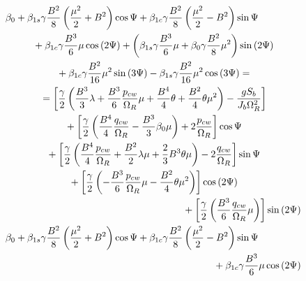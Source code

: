 \begin{gather}
  \label{eq-aero-flapping-coefs-ccw-3}
  \begin{multlined}[0.88\textwidth]
    \beta_0
    + 
    \beta_{1s} \gamma \frac{B^2}{8}
    \left( \frac{\mu^2}{2} + B^2 \right) \cos \Psi
    +
    \beta_{1c} \gamma \frac{B^2}{8}
    \left( \frac{\mu^2}{2} - B^2 \right) \sin \Psi
    \\
    +
    \beta_{1c} \gamma \frac{B^3}{6} \mu \cos \left( 2 \Psi \right)
    +
    \left(
        \beta_{1s} \gamma \frac{B^3}{6} \mu
      + \beta_0 \gamma \frac{B^2}{8} \mu^2
    \right) \sin \left( 2 \Psi \right)
    \\
    +
    \beta_{1c} \gamma \frac{B^2}{16} \mu^2 \sin \left( 3 \Psi \right)
    -
    \beta_{1s} \gamma \frac{B^2}{16} \mu^2 \cos \left( 3 \Psi \right)
    = \\ =
    \left[
      \frac{\gamma}{2}
      \left(
          \frac{B^3}{3} \lambda
        + \frac{B^3}{6} \frac{p_{cw}}{\Omega_R} \mu
        + \frac{B^4}{4} \theta
        + \frac{B^2}{4} \theta \mu^2
      \right) - \frac{ g S_b }{ J_b \Omega_R^2 }
    \right]
    \\
    + \left[
      \frac{\gamma}{2}
      \left(
          \frac{B^4}{4} \frac{q_{cw}}{\Omega_R}
        - \frac{B^3}{3} \beta_0 \mu
      \right) + 2 \frac{p_{cw}}{\Omega_R}
    \right] \cos \Psi
    \\
    + \left[
      \frac{\gamma}{2}
      \left(
          \frac{B^4}{4} \frac{p_{cw}}{\Omega_R}
        + \frac{B^2}{2} \lambda \mu
        + \frac{2}{3} B^3 \theta \mu
        \right) - 2 \frac{q_{cw}}{\Omega_R}
    \right] \sin \Psi
    \\
    + \left[
      \frac{\gamma}{2}
      \left(
        - \frac{B^3}{6} \frac{p_{cw}}{\Omega_R} \mu
        - \frac{B^2}{4} \theta \mu^2
      \right)
    \right] \cos \left( 2 \Psi \right)
    \\
    + \left[
      \frac{\gamma}{2}
      \left( \frac{B^3}{6} \frac{q_{cw}}{\Omega_R} \mu \right)
    \right] \sin \left( 2 \Psi \right)
  \end{multlined}
  \\
  \label{eq-aero-flapping-coefs-cw-3}
  \begin{multlined}[0.88\textwidth]
    \beta_0
    + 
    \beta_{1s} \gamma \frac{B^2}{8}
    \left( \frac{\mu^2}{2} + B^2 \right) \cos \Psi
    +
    \beta_{1c} \gamma \frac{B^2}{8}
    \left( \frac{\mu^2}{2} - B^2 \right) \sin \Psi
    \\
    +
    \beta_{1c} \gamma \frac{B^3}{6} \mu \cos \left( 2 \Psi \right)

\end{multlined}
\end{gather}
